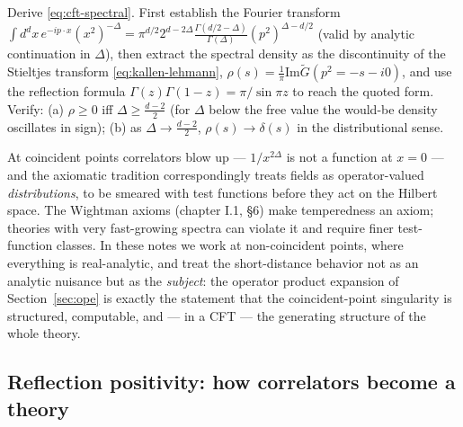 \begin{exercise}[classic]
\label{exr:cft-spectral}
Derive \eqref{eq:cft-spectral}. First establish the Fourier transform
$\int d^dx\, e^{-ip\cdot x} (x^2)^{-\Delta} = \pi^{d/2} 2^{d - 2\Delta}
\frac{\Gamma(d/2 - \Delta)}{\Gamma(\Delta)} (p^2)^{\Delta - d/2}$ (valid by
analytic continuation in $\Delta$), then extract the spectral density as the
discontinuity of the Stieltjes transform \eqref{eq:kallen-lehmann}, $\rho(s) =
\frac{1}{\pi}\mathrm{Im}\tilde G(p^2 = -s - i0)$, and use the reflection
formula $\Gamma(z)\Gamma(1-z) = \pi/\sin \pi z$ to reach the quoted form.
Verify: (a) $\rho \ge 0$ iff $\Delta \ge \frac{d-2}{2}$ (for $\Delta$ below the
free value the would-be density oscillates in sign); (b) as $\Delta \to
\frac{d-2}{2}$, $\rho(s) \to \delta(s)$ in the distributional sense.
\end{exercise}

\begin{reemark}
\label{rem:distributions}
At coincident points correlators blow up --- $1/x^{2\Delta}$ is not a function
at $x = 0$ --- and the axiomatic tradition correspondingly treats fields as
operator-valued \emph{distributions}, to be smeared with test functions before
they act on the Hilbert space. The Wightman axioms (chapter I.1, \S6) make
temperedness an axiom; theories with very fast-growing spectra can violate it
and require finer test-function classes. In these notes we work at non-coincident
points, where everything is real-analytic, and treat the short-distance
behavior not as an analytic nuisance but as the \emph{subject}: the operator
product expansion of Section~\ref{sec:ope} is exactly the statement that the
coincident-point singularity is structured, computable, and --- in a CFT ---
the generating structure of the whole theory.
\end{reemark}

\subsection{Reflection positivity: how correlators become a theory}
\label{sec:reflection-positivity}

